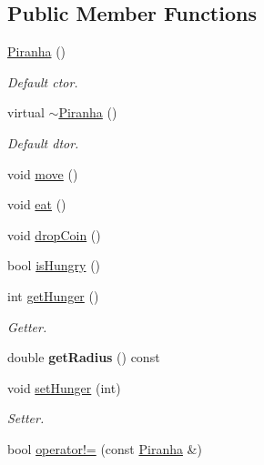 \subsection*{Public Member Functions}
\begin{DoxyCompactItemize}
\item 
\mbox{\hyperlink{class_piranha_a7e3a4c5c7f458c16717c8cb997fc0331}{Piranha}} ()
\begin{DoxyCompactList}\small\item\em Default ctor. \end{DoxyCompactList}\item 
\mbox{\label{class_piranha_a18fe8f76ddfd4c64188d0d98d5de5f13}} 
virtual \mbox{\hyperlink{class_piranha_a18fe8f76ddfd4c64188d0d98d5de5f13}{$\sim$\+Piranha}} ()
\begin{DoxyCompactList}\small\item\em Default dtor. \end{DoxyCompactList}\item 
void \mbox{\hyperlink{class_piranha_a6b86e73b3e5a57ee0fdb768c24ab9b67}{move}} ()
\item 
void \mbox{\hyperlink{class_piranha_ac48c0256edd56c427b3d82f6e0d4df82}{eat}} ()
\item 
void \mbox{\hyperlink{class_piranha_aee107987f36631002f04c5283564382b}{drop\+Coin}} ()
\item 
bool \mbox{\hyperlink{class_piranha_a63ea79c792b44de29b5c6b6abc0f7a71}{is\+Hungry}} ()
\item 
\mbox{\label{class_piranha_af8f25c939fd7874b2acce25f02ffa6e5}} 
int \mbox{\hyperlink{class_piranha_af8f25c939fd7874b2acce25f02ffa6e5}{get\+Hunger}} ()
\begin{DoxyCompactList}\small\item\em Getter. \end{DoxyCompactList}\item 
\mbox{\label{class_piranha_a29adc93d0417ca26a4586077df07ef86}} 
double {\bfseries get\+Radius} () const
\item 
\mbox{\label{class_piranha_aae060974b16e7b39dc97fe2990490299}} 
void \mbox{\hyperlink{class_piranha_aae060974b16e7b39dc97fe2990490299}{set\+Hunger}} (int)
\begin{DoxyCompactList}\small\item\em Setter. \end{DoxyCompactList}\item 
bool \mbox{\hyperlink{class_piranha_a672dc6e23eac17cda9f93737fabce742}{operator!=}} (const \mbox{\hyperlink{class_piranha}{Piranha}} \&)
\end{DoxyCompactItemize}
